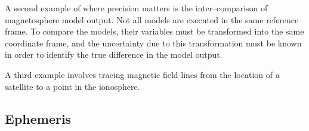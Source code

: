 \documentclass[draft]{agujournal2019}
\begin{document}
A second example of where precision matters is the inter--comparison of magnetosphere model output. Not all models are executed in the same reference frame. To compare the models, their variables must be transformed into the same coordinate frame, and the uncertainty due to this transformation must be known in order to identify the true difference in the model output.

A third example involves tracing magnetic field lines from the location of a satellite to a point in the ionosphere.


\subsection{Ephemeris}
\label{sect:comparisons_ephemeris}
\clearpage
\end{document}
